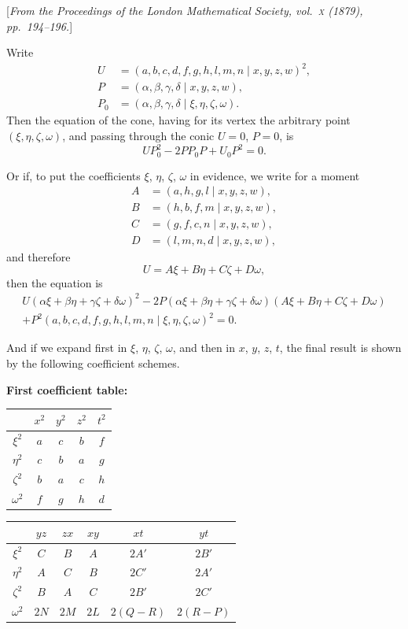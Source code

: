 \documentclass[11pt,a4paper]{book}
\begin{document}
[\textit{From the Proceedings of the London Mathematical Society, vol.~\textsc{x} (1879),
pp.~194--196.}]

Write
\begin{align*}
U &= (a,b,c,d,f,g,h,l,m,n\mid x,y,z,w)^2,\\
P &= (\alpha,\beta,\gamma,\delta\mid x,y,z,w),\\
P_0 &= (\alpha,\beta,\gamma,\delta\mid\xi,\eta,\zeta,\omega).
\end{align*}
Then the equation of the cone, having for its vertex the arbitrary
point $(\xi,\eta,\zeta,\omega)$, and passing through the conic $U=0$, $P=0$, is
\[
UP_0^2 - 2P P_0 P + U_0 P^2 = 0.
\]

Or if, to put the coefficients $\xi$, $\eta$, $\zeta$, $\omega$ in evidence, we write for a moment
\begin{align*}
A &= (a,h,g,l\mid x,y,z,w),\\
B &= (h,b,f,m\mid x,y,z,w),\\
C &= (g,f,c,n\mid x,y,z,w),\\
D &= (l,m,n,d\mid x,y,z,w),
\end{align*}
and therefore
\[
U = A\xi + B\eta + C\zeta + D\omega,
\]
then the equation is
\begin{multline*}
U(\alpha\xi+\beta\eta+\gamma\zeta+\delta\omega)^2
-2P(\alpha\xi+\beta\eta+\gamma\zeta+\delta\omega)(A\xi+B\eta+C\zeta+D\omega)\\
+P^2(a,b,c,d,f,g,h,l,m,n\mid\xi,\eta,\zeta,\omega)^2 = 0.
\end{multline*}

And if we expand first in $\xi$, $\eta$, $\zeta$, $\omega$, and then in $x$, $y$, $z$, $t$,
the final result is shown by the following coefficient schemes.

\begin{center}
\textbf{First coefficient table:}
\end{center}
\begin{center}
\begin{tabular}{c|cccc}
& $x^2$ & $y^2$ & $z^2$ & $t^2$ \\
\hline
$\xi^2$ & $a$ & $c$ & $b$ & $f$ \\
$\eta^2$ & $c$ & $b$ & $a$ & $g$ \\
$\zeta^2$ & $b$ & $a$ & $c$ & $h$ \\
$\omega^2$ & $f$ & $g$ & $h$ & $d$
\end{tabular}
\quad
\begin{tabular}{c|ccccc}
& $yz$ & $zx$ & $xy$ & $xt$ & $yt$ \\
\hline
$\xi^2$ & $C$ & $B$ & $A$ & $2A'$ & $2B'$ \\
$\eta^2$ & $A$ & $C$ & $B$ & $2C'$ & $2A'$ \\
$\zeta^2$ & $B$ & $A$ & $C$ & $2B'$ & $2C'$ \\
$\omega^2$ & $2N$ & $2M$ & $2L$ & $2(Q-R)$ & $2(R-P)$
\end{tabular}
\end{center}
\end{document}
